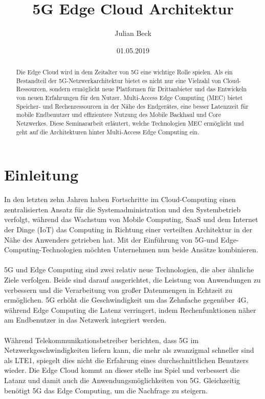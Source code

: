 \documentclass[runningheads]{llncs}
\title{5G Edge Cloud Architektur}
\author{Julian Beck}
\institute{Betreuer: Prof. Dr. rer. nat. Oliver Waldhorst}
\date{01.05.2019}
\numberwithin{figure}{section}
\begin{document}
\let\oldaddcontentsline\addcontentsline
\def\addcontentsline#1#2#3{}
\maketitle
\def\addcontentsline#1#2#3{\oldaddcontentsline{#1}{#2}{#3}}



\begin{abstract}
  Die Edge Cloud wird in dem Zeitalter von 5G eine wichtige Rolle spielen. 
  Als ein Bestandteil der 5G-Netzwerkarchitektur bietet es nicht nur eine Vielzahl von Cloud-Ressourcen, sondern
  ermöglicht neue Platformen für Drittanbieter und das Entwickeln von neuen Erfahrungen für den Nutzer.
  Multi-Access Edge Computing (MEC) bietet Speicher- und Rechenressourcen in der Nähe des Endgerätes, 
  eine besser Latenzzeit für mobile Endbenutzer und effizientere Nutzung des Mobile Backhaul
  und Core Netzwerkes. Diese Seminararbeit erläutert, welche Technologien MEC ermöglicht und geht auf die Architekturen 
  hinter Multi-Access Edge Computing ein.
\end{abstract}

\tableofcontents 
\newpage

\section{Einleitung}
\label{sec:Einleitung}
In den letzten zehn Jahren haben Fortschritte im Cloud-Computing einen zentralisierten Ansatz für die Systemadministration und den 
Systembetrieb verfolgt, während das Wachstum von Mobile Computing, 
SaaS und dem Internet der Dinge (IoT) das Computing in Richtung einer verteilten Architektur in der Nähe des Anwenders getrieben hat. 
Mit der Einführung von 5G-und Edge-Computing-Technologien möchten Unternehmen nun beide Ansätze kombinieren.
\\
\\
5G und Edge Computing sind zwei relativ neue Technologien, die aber ähnliche Ziele verfolgen. 
Beide sind darauf ausgerichtet, die Leistung von Anwendungen zu verbessern 
und die Verarbeitung von großer Datenmengen in Echtzeit zu ermöglichen. 
5G erhöht die Geschwindigkeit um das Zehnfache gegenüber 4G, 
während  Edge Computing die Latenz verringert, indem Rechenfunktionen näher am Endbenutzer in das Netzwerk integriert werden.
\\
\\
Während Telekommunikationsbetreiber berichten, 
dass 5G im Netzwerkgeschwindigkeiten liefern kann, die mehr als zwanzigmal schneller sind als LTE1, 
spiegelt dies nicht die Erfahrung eines durchschnittlichen Benutzers wieder. Die Edge Cloud kommt an dieser stelle ins Spiel und verbessert die Latanz und 
damit auch die Anwendungsmöglichkeiten von 5G.
Gleichzeitig benötigt 5G das Edge Computing, um die Nachfrage zu steigern. 
\end{document}
